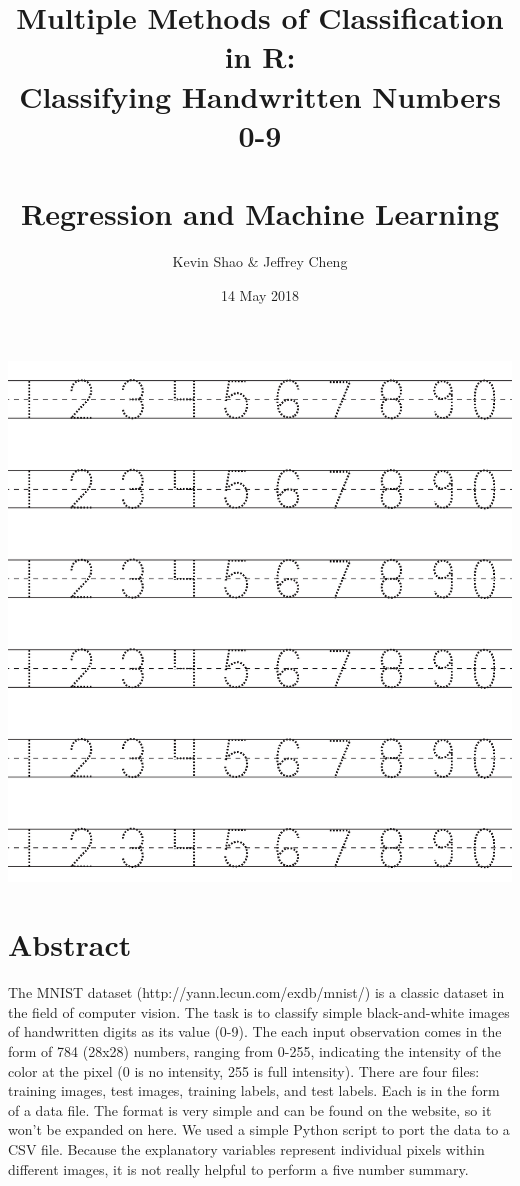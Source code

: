\documentclass[10pt]{extarticle}
\title{Multiple Methods of Classification in R:\\ Classifying Handwritten Numbers 0-9\\\textrm{ }\\\large Regression and Machine Learning}
\date{14 May 2018}
\author{Kevin Shao \& Jeffrey Cheng}
\begin{document}
\allowdisplaybreaks
{}
\renewcommand{\labelitemi}{$>$}
\maketitle
\begin{center}

\includegraphics[scale=0.5]{numbers.png}

\end{center}
\newpage

\section{Abstract}

The MNIST dataset (http://yann.lecun.com/exdb/mnist/) is a classic dataset in the field of computer vision. The task is to classify simple black-and-white images of handwritten digits as its value (0-9). The each input observation comes in the form of 784 (28x28) numbers, ranging from 0-255, indicating the intensity of the color at the pixel (0 is no intensity, 255 is full intensity). There are four files: training images, test images, training labels, and test labels. Each is in the form of a data file. The format is very simple and can be found on the website, so it won't be expanded on here. We used a simple Python script to port the data to a CSV file.
Because the explanatory variables represent individual pixels within different images, it is not really helpful to perform a five number summary. 
\end{document}
